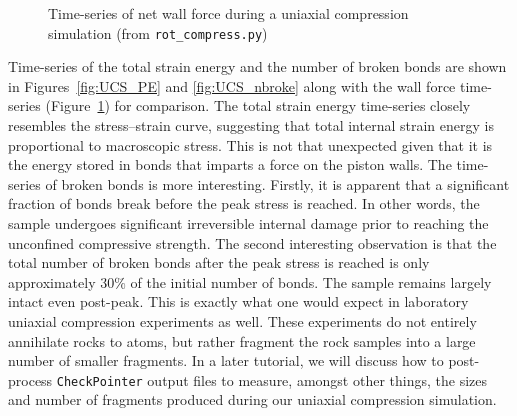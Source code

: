 \begin{figure}
\begin{center}
\end{center}
\caption{Time-series of net wall force during a uniaxial compression simulation (from \texttt{rot\_compress.py})} \label{fig:UCS_force}
\end{figure}

Time-series of the total strain energy and the number of broken bonds are shown in Figures~\ref{fig:UCS_PE} and \ref{fig:UCS_nbroke} along with the wall force time-series (Figure~\ref{fig:UCS_force}) for comparison. The total strain energy time-series closely resembles the stress--strain curve, suggesting that total internal strain energy is proportional to macroscopic stress. This is not that unexpected given that it is the energy stored in bonds that imparts a force on the piston walls. The time-series of broken bonds is more interesting. Firstly, it is apparent that a significant fraction of bonds break before the peak stress is reached. In other words, the sample undergoes significant irreversible internal damage prior to reaching the unconfined compressive strength. The second interesting observation is that the total number of broken bonds after the peak stress is reached is only approximately $30\%$ of the initial number of bonds. The sample remains largely intact even post-peak. This is exactly what 
one would expect in laboratory uniaxial compression experiments as well. These experiments do not entirely annihilate rocks to atoms, but rather fragment the rock samples into a large number of smaller fragments. In a later tutorial, we will discuss how to post-process \texttt{CheckPointer} output files to measure, amongst other things, the sizes and number of fragments produced during our uniaxial compression simulation.

